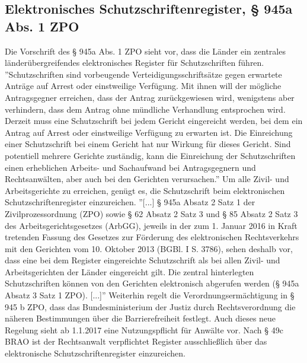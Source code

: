 \subsection*{Elektronisches Schutzschriftenregister, § 945a Abs. 1 ZPO}
Die Vorschrift des § 945a Abs. 1 ZPO sieht vor, dass die Länder ein zentrales länderübergreifendes elektronisches Register für Schutzschriften führen. ''Schutzschriften sind vorbeugende Verteidigungsschriftsätze gegen erwartete Anträge auf Arrest oder einstweilige Verfügung. Mit ihnen will der mögliche Antragsgegner erreichen, dass der Antrag zurückgewiesen wird, wenigstens aber verhindern, dass dem Antrag ohne mündliche Verhandlung entsprochen wird. Derzeit muss eine Schutzschrift bei jedem Gericht eingereicht werden, bei dem ein Antrag auf Arrest oder einstweilige Verfügung zu erwarten ist. Die Einreichung einer Schutzschrift bei einem Gericht hat nur Wirkung für dieses Gericht. Sind potentiell mehrere Gerichte zuständig, kann die Einreichung der Schutzschriften einen erheblichen Arbeits- und Sachaufwand bei Antragsgegnern und Rechtsanwälten, aber auch bei den Gerichten verursachen.'' \cite{bea:bea:brak-schutzschriften} Um alle Zivil- und Arbeitsgerichte zu erreichen, genügt es, die Schutzschrift beim  elektronischen Schutzschriftenregister einzureichen. ''[...] § 945a Absatz 2 Satz 1 der Zivilprozessordnung (ZPO) sowie § 62 Absatz 2 Satz 3 und § 85 Absatz 2 Satz 3 des Arbeitsgerichtsgesetzes (ArbGG), jeweils in der zum 1. Januar 2016 in Kraft tretenden Fassung des Gesetzes zur Förderung des elektronischen Rechtsverkehrs mit den Gerichten vom 10. Oktober 2013 (BGBl. I S. 3786), sehen deshalb vor, dass eine bei dem Register eingereichte Schutzschrift als bei allen Zivil- und Arbeitsgerichten der Länder eingereicht gilt. Die zentral hinterlegten Schutzschriften können von den Gerichten elektronisch abgerufen werden (§ 945a Absatz 3 Satz 1 ZPO). [...]''\cite{bea:bea:brak-schutzschriften} Weiterhin regelt die Verordnungsermächtigung in § 945 b ZPO, dass das Bundesministerium der Justiz durch Rechtsverordnung die näheren Bestimmungen über die Barrierefreiheit festlegt.
Auch dieses neue Regelung sieht ab 1.1.2017 eine Nutzungspflicht für Anwälte vor. Nach § 49c BRAO ist der Rechtsanwalt verpflichtet Register ausschließlich über das elektronische Schutzschriftenregister einzureichen.
